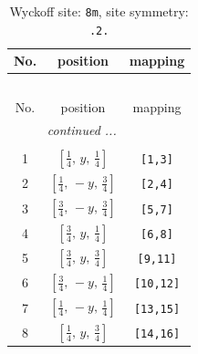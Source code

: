 \documentclass[fleqn,8pt]{jsarticle}
\begin{document}
\renewcommand{\arraystretch}{1.2}
\begin{longtable}{ccc}
\caption{Wyckoff site: {\tt 8m}, site symmetry: {\tt .2.}}
 \\
 \hline \hline
No. & position & mapping \\ \hline \endfirsthead

\multicolumn{2}{l}{\tablename\ \thetable{}} \\
 \hline \hline
No. & position & mapping \\ \hline \endhead

 \hline \hline
\multicolumn{2}{r}{\footnotesize\it continued ...} \\ \endfoot

 \hline \hline
\multicolumn{2}{r}{} \\ \endlastfoot

1 & $\left[ \frac{1}{4},\, y,\, \frac{1}{4} \right]$ & {\tt [1,3]} \\ \hline
2 & $\left[ \frac{1}{4},\, - y,\, \frac{3}{4} \right]$ & {\tt [2,4]} \\ \hline
3 & $\left[ \frac{3}{4},\, - y,\, \frac{3}{4} \right]$ & {\tt [5,7]} \\ \hline
4 & $\left[ \frac{3}{4},\, y,\, \frac{1}{4} \right]$ & {\tt [6,8]} \\ \hline
5 & $\left[ \frac{3}{4},\, y,\, \frac{3}{4} \right]$ & {\tt [9,11]} \\ \hline
6 & $\left[ \frac{3}{4},\, - y,\, \frac{1}{4} \right]$ & {\tt [10,12]} \\ \hline
7 & $\left[ \frac{1}{4},\, - y,\, \frac{1}{4} \right]$ & {\tt [13,15]} \\ \hline
8 & $\left[ \frac{1}{4},\, y,\, \frac{3}{4} \right]$ & {\tt [14,16]} \\
\end{longtable}
\renewcommand{\arraystretch}{1.2}
\end{document}
